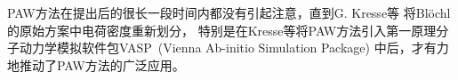 {%


%
\textrm{PAW}方法在提出后的很长一段时间内都没有引起注意，直到\textrm{G. Kresse}等%
将\textrm{Bl\"ochl}的原始方案中电荷密度重新划分，%
特别是在\textrm{Kresse}等将\textrm{PAW}方法引入第一原理分子动力学模拟软件包\textrm{VASP~(Vienna Ab-initio Simulation Package)}%
中后，才有力地推动了\textrm{PAW}方法的广泛应用。

}
